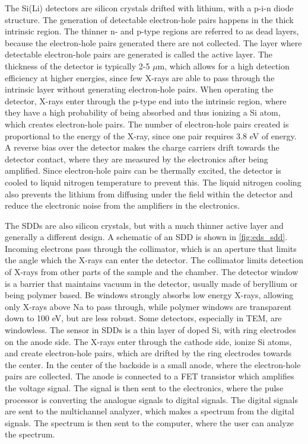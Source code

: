 The Si(Li) detectors are silicon crystals drifted with lithium, with a p-i-n diode structure.
The generation of detectable electron-hole pairs happens in the thick intrinsic region.
The thinner n- and p-type regions are referred to as dead layers, because the electron-hole pairs generated there are not collected.
The layer where detectable electron-hole pairs are generated is called the active layer.
The thickness of the detector is typically 2-5 $\mu$m, which allows for a high detection efficiency at higher energies, since few X-rays are able to pass through the intrinsic layer without generating electron-hole pairs.
When operating the detector, X-rays enter through the p-type end into the intrinsic region, where they have a high probability of being absorbed and thus ionizing a Si atom, which creates electron-hole pairs.
The number of electron-hole pairs created is proportional to the energy of the X-ray, since one pair requires 3.8 eV of energy.
A reverse bias over the detector makes the charge carriers drift towards the detector contact, where they are measured by the electronics after being amplified.
Since electron-hole pairs can be thermally excited, the detector is cooled to liquid nitrogen temperature to prevent this.
The liquid nitrogen cooling also prevents the lithium from diffusing under the field within the detector and reduce the electronic noise from the amplifiers in the electronics.

The SDDs are also silicon crystals, but with a much thinner active layer and generally a different design.
A schematic of an SDD is shown in \cref{fig:eds_sdd}.
Incoming electrons pass through the collimator, which is an aperture that limits the angle which the X-rays can enter the detector.
The collimator limits detection of X-rays from other parts of the sample and the chamber.
The detector window is a barrier that maintains vacuum in the detector, usually made of beryllium or being polymer based.
Be windows strongly absorbs low energy X-rays, allowing only X-rays above Na to pass through, while polymer windows are transparent down to 100 eV, but are less robust.
Some detectors, especially in TEM, are windowless.
The sensor in SDDs is a thin layer of doped Si, with ring electrodes on the anode side.
The X-rays enter through the cathode side, ionize Si atoms, and create electron-hole pairs, which are drifted by the ring electrodes towards the center.
In the center of the backside is a small anode, where the electron-hole pairs are collected.
The anode is connected to a FET transistor which amplifies the voltage signal.
The signal is then sent to the electronics, where the pulse processor is converting the analogue signals to digital signals.
The digital signals are sent to the multichannel analyzer, which makes a spectrum from the digital signals.
The spectrum is then sent to the computer, where the user can analyze the spectrum.


